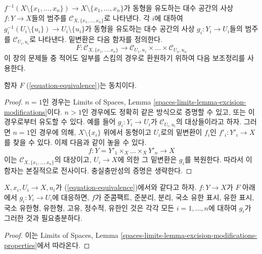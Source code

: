 \medskip\noindent
$f^{-1}(X \setminus \{x_1, \ldots, x_n\}) \to
X \setminus \{x_1, \ldots, x_n\}$가 동형을 유도하는 대수 공간의 사상
$f : Y \to X$들의 범주를 $\mathcal{C}_{X, \{x_1, \ldots, x_n\}}$로
나타낸다. 각 $i$에 대하여
$g_i^{-1}(U_i \setminus \{u_i\}) \to U_i \setminus \{u_i\}$가 동형을
유도하는 대수 공간의 사상 $g_i : Y_i \to U_i$들의 범주를
$\mathcal{C}_{U_i, u_i}$로 나타낸다. 밑변환은 다음 함자를 정의한다.
\begin{equation}
\label{equation-equivalence}
F :
\mathcal{C}_{X, \{x_1, \ldots, x_n\}}
\longrightarrow
\mathcal{C}_{U_1, u_1} \times \ldots \times \mathcal{C}_{U_n, u_n}
\end{equation}
이 장의 문제들 중 적어도 일부를 스킴의 경우로 환원하기 위하여 다음
보조정리를 사용한다.

\begin{lemma}
\label{lemma-equivalence}
함자 $F$ (\ref{equation-equivalence})는 동치이다.
\end{lemma}

\begin{proof}
$n = 1$인 경우는 Limits of Spaces, Lemma
\ref{spaces-limits-lemma-excision-modifications}이다.
$n > 1$인 경우에도 정확히 같은 방식으로 증명할 수 있고, 또는 이 경우로부터
유도할 수 있다. 예를 들어 $g_i : Y_i \to U_i$가
$\mathcal{C}_{U_i, u_i}$의 대상들이라고 하자. 그러면 $n = 1$인 경우에 의해,
$X \setminus \{x_i\}$ 위에서 동형이고 $U_i$로의 밑변환이
$f_i$인 $f'_i : Y'_i \to X$를 찾을 수 있다. 이제 다음과 같이 놓을 수 있다.
$$
f : Y = Y'_1 \times_X \ldots \times_X Y'_n \to X
$$
이는 $\mathcal{C}_{X, \{x_1, \ldots, x_n\}}$의 대상이고,
$U_i \to X$에 의한 그 밑변환은 $g_i$를 복원한다. 따라서 이 함자는
본질적으로 전사이다. 충실충만성의 증명은 생략한다.
\end{proof}

\begin{lemma}
\label{lemma-equivalence-properties}
$X, x_i, U_i \to X, u_i$가 (\ref{equation-equivalence})에서와 같다고 하자.
$f : Y \to X$가 $F$ 아래에서 $g_i : Y_i \to U_i$에 대응하면,
$f$가 준콤팩트, 준분리, 분리, 국소 유한 표시, 유한 표시, 국소 유한형,
유한형, 고유, 정수적, 유한인 것은 각각 모든 $i = 1, \ldots, n$에 대하여
$g_i$가 그러한 것과 필요충분하다.
\end{lemma}

\begin{proof}
이는 Limits of Spaces, Lemma
\ref{spaces-limits-lemma-excision-modifications-properties}에서 따라온다.
\end{proof}

